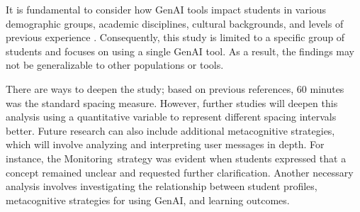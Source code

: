 \documentclass[a4paper,twoside]{article}
\begin{document}
It is fundamental to consider how GenAI tools impact students in various
demographic groups, academic disciplines, cultural backgrounds, and levels of
previous experience \citep{catalan21} \citep{neo22}. Consequently, this study is
limited to a specific group of students and focuses on using a single GenAI
tool. As a result, the findings may not be generalizable to other populations or
tools.

There are ways to deepen the study; based on previous references, 60 minutes was
the standard spacing measure. However, further studies will deepen this analysis
using a quantitative variable to represent different spacing intervals better.
Future research can also include additional metacognitive strategies, which will
involve analyzing and interpreting user messages in depth. For instance, the
Monitoring strategy was evident when students expressed that a concept remained
unclear and requested further clarification. Another necessary analysis involves
investigating the relationship between student profiles, metacognitive
strategies for using GenAI, and learning outcomes.


{\small
}
\end{document}
